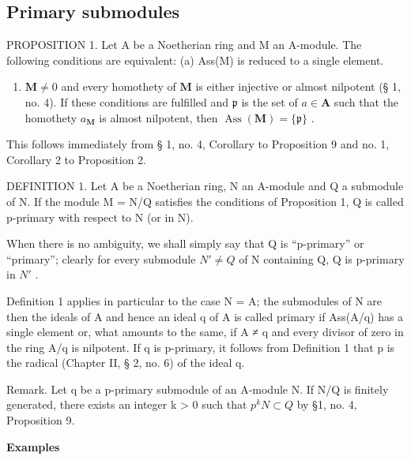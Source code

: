\subsection{Primary submodules}

PROPOSITION 1. Let A be a Noetherian ring and M an A-module. The following conditions are equivalent: (a) Ass(M) is reduced to a single element.

\begin{enumerate}
\def\labelenumi{(\alph{enumi})}
\setcounter{enumi}{1}
\tightlist
\item
  \(\mathbf{M} \neq 0\) and every homothety of \(\mathbf{M}\) is either injective or almost nilpotent (§ 1, no. 4). If these conditions are fulfilled and \(\mathfrak{p}\) is the set of \(a \in \mathbf{A}\) such that the homothety \(a_{\mathbf{M}}\) is almost nilpotent, then \(\operatorname{Ass}(\mathbf{M}) = \{\mathfrak{p}\}\) .
\end{enumerate}

This follows immediately from § 1, no. 4, Corollary to Proposition 9 and no. 1, Corollary 2 to Proposition 2.

DEFINITION 1. Let A be a Noetherian ring, N an A-module and Q a submodule of N. If the module M = N/Q satisfies the conditions of Proposition 1, Q is called p-primary with respect to N (or in N).

When there is no ambiguity, we shall simply say that Q is ``p-primary'' or ``primary''; clearly for every submodule \(N' \neq Q\) of N containing Q, Q is p-primary in \(N'\) .

Definition 1 applies in particular to the case N = A; the submodules of N are then the ideals of A and hence an ideal q of A is called primary if Ass(A/q) has a single element or, what amounts to the same, if A ≠ q and every divisor of zero in the ring A/q is nilpotent. If q is p-primary, it follows from Definition 1 that p is the radical (Chapter II, § 2, no. 6) of the ideal q.

Remark. Let q be a p-primary submodule of an A-module N. If N/Q is finitely generated, there exists an integer k \textgreater{} 0 such that \(p^{k}N \subset Q\) by §1, no. 4, Proposition 9.

\textbf{Examples}\par

